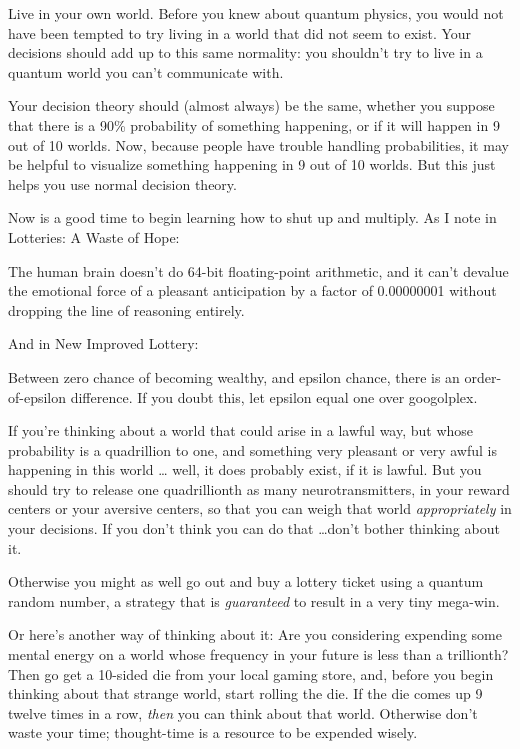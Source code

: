 {
 Live in your own world. Before you knew about quantum physics, you
would not have been tempted to try living in a world that did not seem
to exist. Your decisions should add up to this same normality: you
shouldn't try to live in a quantum world you
can't communicate with.}

{
 Your decision theory should (almost always) be the same, whether
you suppose that there is a 90\% probability of something happening, or
if it will happen in 9 out of 10 worlds. Now, because people have
trouble handling probabilities, it may be helpful to visualize
something happening in 9 out of 10 worlds. But this just helps you use
normal decision theory.}

{
 Now is a good time to begin learning how to shut up and multiply.
As I note in Lotteries: A Waste of Hope:}

{
 The human brain doesn't do 64-bit floating-point
arithmetic, and it can't devalue the emotional force of
a pleasant anticipation by a factor of 0.00000001 without dropping the
line of reasoning entirely.}

{
 And in New Improved Lottery:}

{
 Between zero chance of becoming wealthy, and epsilon chance, there
is an order-of-epsilon difference. If you doubt this, let epsilon equal
one over googolplex.}

{
 If you're thinking about a world that could arise
in a lawful way, but whose probability is a quadrillion to one, and
something very pleasant or very awful is happening in this world \ldots
well, it does probably exist, if it is lawful. But you should try to
release one quadrillionth as many neurotransmitters, in your reward
centers or your aversive centers, so that you can weigh that world
\textit{appropriately} in your decisions. If you don't
think you can do that \ldots don't bother thinking about
it.}

{
 Otherwise you might as well go out and buy a lottery ticket using
a quantum random number, a strategy that is \textit{guaranteed} to
result in a very tiny mega-win.}

{
 Or here's another way of thinking about it: Are
you considering expending some mental energy on a world whose frequency
in your future is less than a trillionth? Then go get a 10-sided die
from your local gaming store, and, before you begin thinking about that
strange world, start rolling the die. If the die comes up 9 twelve
times in a row, \textit{then} you can think about that world. Otherwise
don't waste your time; thought-time is a resource to be
expended wisely.}

